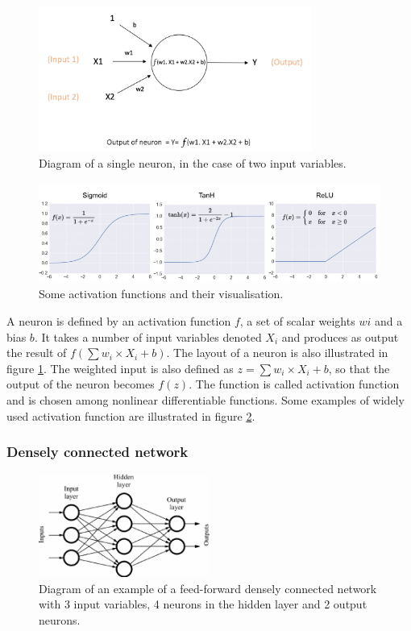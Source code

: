 \begin{figure}
    \centering
    \includegraphics[width=0.8\textwidth]{Images/neuron_diagram}
    \caption{Diagram of a single neuron, in the case of two input variables.}
    \label{fig:neuron_diagram}
\end{figure}


\begin{figure}
    \centering
    \includegraphics[width=\textwidth]{Images/activation_functions.png}
    \caption{Some activation functions and their visualisation.}
    \label{fig:activation_functions}
\end{figure}

A neuron is defined by an activation function $f$, a set of scalar weights $wi$ and a bias $b$. It takes a number of input variables denoted $X_i$ and produces as output the result of $f(\sum w_i\times X_i + b)$. The layout of a neuron is also illustrated in figure \ref{fig:neuron_diagram}. The weighted input is also defined as $z = \sum w_i\times X_i + b$, so that the output of the neuron becomes $f(z)$. The function is called activation function and is chosen among nonlinear differentiable functions. Some examples of widely used activation function are illustrated in figure \ref{fig:activation_functions}. 

\subsubsection{Densely connected network}


\begin{figure}
    \centering
    \includegraphics[width=0.5\textwidth]{Images/dense_network.png}
    \caption{Diagram of an example of a feed-forward densely connected network with 3 input variables, 4 neurons in the hidden layer and 2 output neurons.}
    \label{fig:dense_network}
\end{figure}

